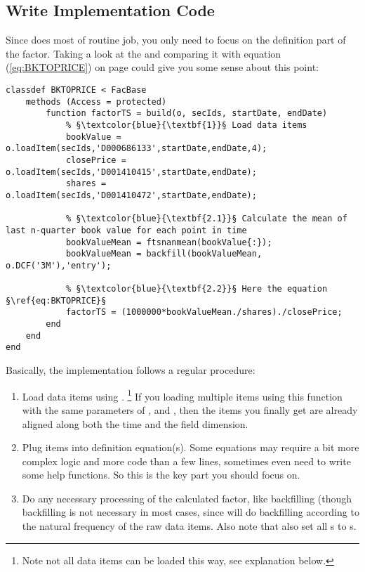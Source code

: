 \subsection{Write Implementation Code\label{sec:Implementation}}

Since  does most of routine job,
you only need to focus on the definition part of the factor.
Taking a look at the  and 
comparing it with equation (\ref{eq:BKTOPRICE}) on page \pageref{eq:BKTOPRICE}
could give you some sense about this point:
\begin{lstlisting}
classdef BKTOPRICE < FacBase
    methods (Access = protected)
        function factorTS = build(o, secIds, startDate, endDate)
            % §\textcolor{blue}{\textbf{1}}§ Load data items
            bookValue = o.loadItem(secIds,'D000686133',startDate,endDate,4);
            closePrice = o.loadItem(secIds,'D001410415',startDate,endDate);
            shares = o.loadItem(secIds,'D001410472',startDate,endDate);
            
            % §\textcolor{blue}{\textbf{2.1}}§ Calculate the mean of last n-quarter book value for each point in time
            bookValueMean = ftsnanmean(bookValue{:});
            bookValueMean = backfill(bookValueMean, o.DCF('3M'),'entry');
            
            % §\textcolor{blue}{\textbf{2.2}}§ Here the equation §\ref{eq:BKTOPRICE}§
            factorTS = (1000000*bookValueMean./shares)./closePrice;
        end
    end
end
\end{lstlisting}

Basically, the implementation follows a regular procedure:
\begin{enumerate}
   \item Load data items using .
         \footnote{Note not all data items can be loaded this way, see explanation below.}
         If you loading multiple items using this function
         with the same parameters of ,  and ,
         then the items you finally get are already aligned along both the time and the field dimension.
   \item Plug items into definition equation(s).
         Some equations may require a bit more complex logic and more code than a few lines,
         sometimes even need to write some help functions.
         So this is the key part you should focus on.
   \item Do any necessary processing of the calculated factor, 
         like backfilling
         (though backfilling is not necessary in most cases, 
         since  will do backfilling according to the natural frequency of the raw data items. 
         Also note that  also set all s to s.
\end{enumerate}

